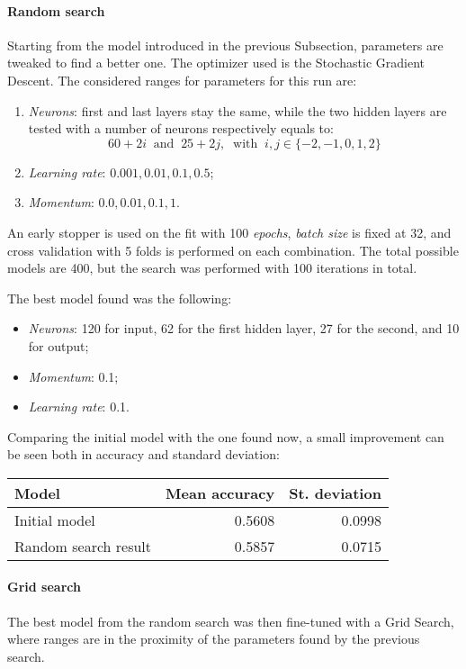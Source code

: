 \paragraph{Random search}
Starting from the model introduced in the previous Subsection, parameters are 
tweaked to find a better one.
The optimizer used is the Stochastic Gradient Descent.
The considered ranges for parameters for this run are: 
\begin{enumerate}
    \item \emph{Neurons}: first and last layers stay the same, while 
    the two hidden layers are tested with a number of neurons respectively 
    equals to: 
    $$60 + 2i\;\;\text{and}\;\;25 + 2j,\;\;\text{with}\;\; i, j \in \{-2,-1,0,1,2\}$$
    \item \emph{Learning rate}: $0.001, 0.01, 0.1, 0.5$;
    \item \emph{Momentum}: $0.0, 0.01, 0.1, 1$.
\end{enumerate}

An early stopper is used on the fit with 100 \emph{epochs}, \emph{batch size} 
is fixed at 
32, and cross validation with 5 folds is performed on each combination.
The total possible models are 400, but the search was performed with 100 iterations
in total.

The best model found was the following: 
\begin{itemize}
    \item \emph{Neurons}: 120 for input, 62 for the first hidden layer, 27 for the second, and 10 for output; 
    \item \emph{Momentum}: 0.1;
    \item \emph{Learning rate}: 0.1.
\end{itemize}
Comparing the initial model with the one found now, a small improvement 
can be seen both in accuracy and standard deviation:
\begin{center}
    \begin{tabular}{ |l|r|r| } 
        \hline
        Model & Mean accuracy & St. deviation \\
        \hline
        Initial model & 0.5608& 0.0998\\
        Random search result & 0.5857 & 0.0715 \\
        \hline
    \end{tabular}
\end{center}

\paragraph{Grid search}
The best model from the random search was then fine-tuned with a Grid Search, 
where ranges are in the proximity of the parameters found by the previous search.

